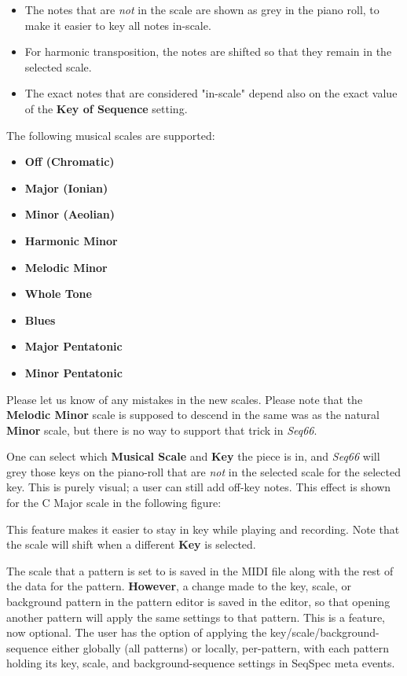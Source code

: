    \begin{itemize}
      \item The notes that are \textsl{not}
         in the scale are shown as grey in the piano
         roll, to make it easier to key all notes in-scale.
      \item For harmonic transposition, the notes are shifted
         so that they remain in the selected scale.
      \item The exact notes that are considered "in-scale" depend also on the 
         exact value of the \textbf{Key of Sequence} setting.
   \end{itemize}

   The following musical scales are supported:

   \begin{itemize}
      \item \textbf{Off (Chromatic)}
      \item \textbf{Major (Ionian)}
      \item \textbf{Minor (Aeolian)}
      \item \textbf{Harmonic Minor}
      \item \textbf{Melodic Minor}
      \item \textbf{Whole Tone}
      \item \textbf{Blues}
      \item \textbf{Major Pentatonic}
      \item \textbf{Minor Pentatonic}
   \end{itemize}

   Please let us know of any mistakes in the new scales.
   Please note that the \textbf{Melodic Minor} scale is supposed to
   descend in the same was as the natural \textbf{Minor} scale, but
   there is no way to support that trick in \textsl{Seq66}.

   One can select which \textbf{Musical Scale} and
   \textbf{Key} the piece is in,
   and \textsl{Seq66} will grey those keys on the piano-roll that
   are \textsl{not} in the selected scale for the selected key.
   This is purely visual; a user can still add off-key notes.
   This effect is shown for the C Major scale in the following figure:

   This feature makes it easier to stay in key while playing and
   recording.  Note that the scale will shift when a different
   \textbf{Key} is selected.

   The scale that a pattern is set to is
   saved in the MIDI file along with the rest of the data for the pattern.
   \textbf{However},
   a change made to the key, scale, or background pattern in
   the pattern editor is saved in the editor, so that opening another pattern
   will apply the same settings to that pattern.  This is a feature, now
   optional.
   The user has the option of applying the key/scale/background-sequence
   either globally (all patterns) or locally, per-pattern, with each pattern
   holding its key, scale, and background-sequence settings in
   SeqSpec meta events.

